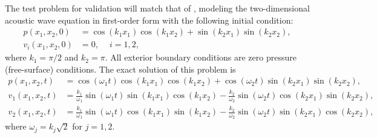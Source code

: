The test problem for validation will match that of \cite{kozdon2016stable},
modeling the two-dimensional acoustic wave equation in first-order form with
the following initial condition:
\begin{align}
  p(x_{1},x_{2},0) &=
  \cos\left(k_{1} x_{1}\right)\cos\left(k_{1} x_{2}\right)
  +
  \sin\left(k_{2} x_{1}\right)\sin\left(k_{2} x_{2}\right),\\
  v_{i}(x_{1},x_{2},0) &= 0,~ \quad i=1,2,
\end{align}
where $k_{1} = \pi/2$ and $k_{2} = \pi$. All exterior boundary conditions are
zero pressure (free-surface) conditions. The exact solution of this problem is
\begin{align}
  p(x_{1},x_{2},t) &=
  \cos\left(\omega_{1} t\right)
  \cos\left(k_{1} x_{1}\right)\cos\left(k_{1} x_{2}\right)
  +
  \cos\left(\omega_{2} t\right)
  \sin\left(k_{2} x_{1}\right)\sin\left(k_{2} x_{2}\right),\\
  v_{1}(x_{1},x_{2},t) &=
  \frac{k_{1}}{\omega_{1}} \sin\left(\omega_{1} t\right)
  \sin\left(k_{1} x_{1}\right)\cos\left(k_{1} x_{2}\right)
  -
  \frac{k_{2}}{\omega_{2}} \sin\left(\omega_{2} t\right)
  \cos\left(k_{2} x_{1}\right)\sin\left(k_{2} x_{2}\right),\\
  v_{2}(x_{1},x_{2},t) &=
  \frac{k_{1}}{\omega_{1}} \sin\left(\omega_{1} t\right)
  \cos\left(k_{1} x_{1}\right)\sin\left(k_{1} x_{2}\right)
  -
  \frac{k_{2}}{\omega_{2}} \sin\left(\omega_{2} t\right)
  \sin\left(k_{2} x_{1}\right)\cos\left(k_{2} x_{2}\right),
\end{align}
where $\omega_{j} = k_{j}\sqrt{2}$ for $j=1,2$. 

